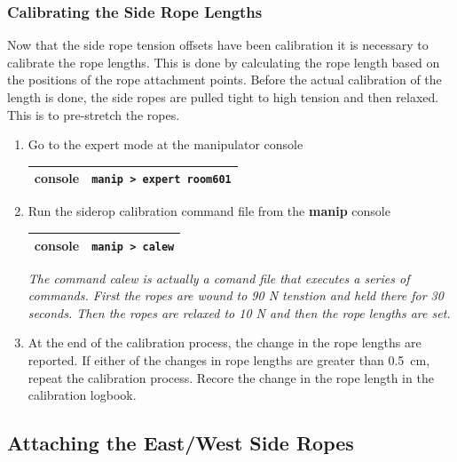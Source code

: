 \documentclass[11pt]{article}
\begin{document}

\subsubsection{Calibrating the Side Rope Lengths}
Now that the side rope tension offsets have been calibration it is necessary to calibrate the rope lengths. This is done by calculating the rope length based on the positions of the rope attachment points. Before the actual calibration of the length is done, the side ropes are pulled tight to high tension and then relaxed. This is to pre-stretch the ropes.
\begin{enumerate}
\item \CheckBox[name=csrl1]{} Go to the expert mode at the manipulator console
\begin{center}
\begin{tabular}{|c|c|}
\hline
console & \verb+manip > expert room601+\\
\hline
\end{tabular}
\end{center}
\item \CheckBox[name=csrl2]{} Run the siderop calibration command file from the {\bf manip} console
\begin{center}
\begin{tabular}{|c|c|}
\hline
console & \verb+manip > calew+\\
\hline
\end{tabular}
\end{center}
{\it The command calew is actually a comand file that executes a series of commands. First the ropes are wound to 90 N tenstion and held there for 30 seconds. Then the ropes are relaxed to 10 N and then the rope lengths are set.}
\item \CheckBox[name=csrl3] At the end of the calibration process, the change in the rope lengths are reported. If either of the changes in rope lengths are greater than 0.5~cm, repeat the calibration process. Recore the change in the rope length in the calibration logbook.
\end{enumerate}

\subsection{Attaching the East/West Side Ropes}
\end{document}
